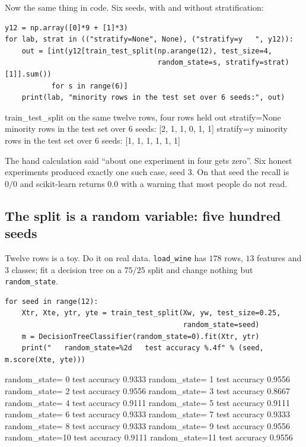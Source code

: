 \documentclass[11pt]{article}
\begin{document}
Now the same thing in code. Six seeds, with and without stratification:

\begin{lstlisting}
y12 = np.array([0]*9 + [1]*3)
for lab, strat in (("stratify=None", None), ("stratify=y   ", y12)):
    out = [int(y12[train_test_split(np.arange(12), test_size=4,
                                    random_state=s, stratify=strat)[1]].sum())
           for s in range(6)]
    print(lab, "minority rows in the test set over 6 seeds:", out)
\end{lstlisting}
\begin{codeout}
train_test_split on the same twelve rows, four rows held out
   stratify=None   minority rows in the test set over 6 seeds: [2, 1, 1, 0, 1, 1]
   stratify=y      minority rows in the test set over 6 seeds: [1, 1, 1, 1, 1, 1]
\end{codeout}

The hand calculation said ``about one experiment in four gets zero''. Six
honest experiments produced exactly one such case, seed $3$. On that seed the
recall is $0/0$ and scikit-learn returns $0.0$ with a warning that most people
do not read.

\subsection{The split is a random variable: five hundred seeds}
\label{sec:spread}

Twelve rows is a toy. Do it on real data. \texttt{load\_wine} has $178$ rows,
$13$ features and $3$ classes; fit a decision tree on a $75/25$ split and
change nothing but \texttt{random\_state}.

\begin{lstlisting}
for seed in range(12):
    Xtr, Xte, ytr, yte = train_test_split(Xw, yw, test_size=0.25,
                                          random_state=seed)
    m = DecisionTreeClassifier(random_state=0).fit(Xtr, ytr)
    print("   random_state=%2d   test accuracy %.4f" % (seed, m.score(Xte, yte)))
\end{lstlisting}
\begin{codeout}
   random_state= 0   test accuracy 0.9333
   random_state= 1   test accuracy 0.9556
   random_state= 2   test accuracy 0.9556
   random_state= 3   test accuracy 0.8667
   random_state= 4   test accuracy 0.9111
   random_state= 5   test accuracy 0.9111
   random_state= 6   test accuracy 0.9333
   random_state= 7   test accuracy 0.9333
   random_state= 8   test accuracy 0.9333
   random_state= 9   test accuracy 0.9556
   random_state=10   test accuracy 0.9111
   random_state=11   test accuracy 0.9556
\end{codeout}
\end{document}
